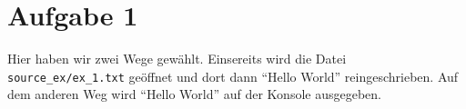 \section*{Aufgabe 1}
Hier haben wir zwei Wege gewählt. 
Einsereits wird die Datei \texttt{source\_ex/ex\_1.txt} geöffnet und dort dann \enquote{Hello World} reingeschrieben.
Auf dem anderen Weg wird \enquote{Hello World} auf der Konsole ausgegeben.